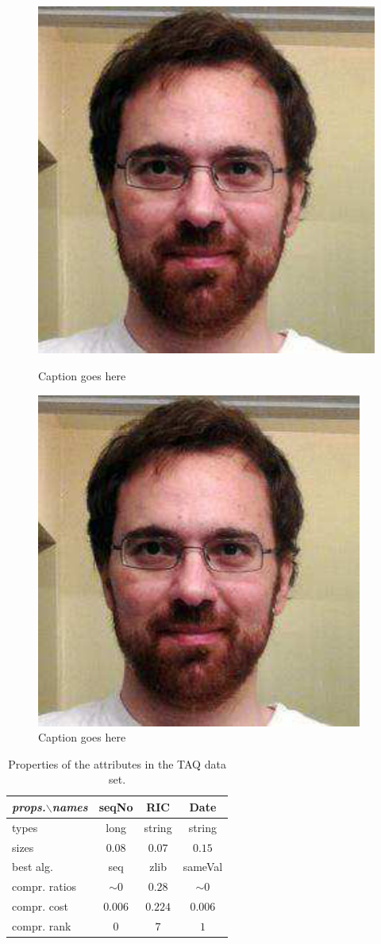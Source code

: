 \begin{figure}[t]
\centering
\begin{minipage}{0.48\linewidth}
  \centering
  \includegraphics[width=0.5\linewidth]{figures/bugra.eps}
  \caption{Caption goes here}\label{fig:bugra1}
\end{minipage}
\vspace{0.01\linewidth}
\begin{minipage}{0.48\linewidth}
  \centering
  \includegraphics[width=0.5\linewidth]{figures/bugra.pdf}
  \caption{Caption goes here}\label{fig:bugra2}  
\end{minipage}
\end{figure}


\begin{table}[t]
\centering
\begin{tabular}{|l||c|c|c|}\hline 
\emph{props.}$\backslash$\emph{names} 
              & seqNo    & RIC     & Date         \\\hline
types         & long     & string  & string       \\\hline
sizes         & $0.08$   & $0.07$  & $0.15$       \\\hline
best alg.     & seq      & zlib    & sameVal      \\\hline
compr. ratios & $\sim 0$ & $0.28$  & $\sim 0$     \\\hline
compr. cost   & $0.006$  & $0.224$ & $0.006$      \\\hline
compr. rank   & $0$      & $7$     & $1$          \\\hline
\end{tabular}
\caption{Properties of the attributes in the TAQ data set.}\label{tbl:data}
\end{table}            

